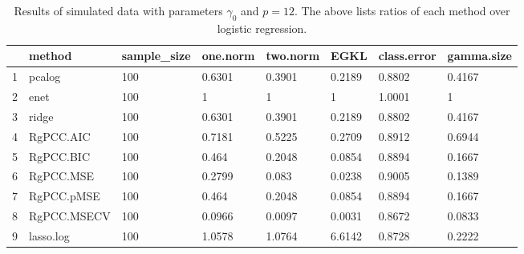 \begin{table}[ht]
\centering
\begin{tabular}{rlllllll}
  \hline
 & method & sample\_size & one.norm & two.norm & EGKL & class.error & gamma.size \\ 
  \hline
1 & pcalog & 100 & 0.6301 & 0.3901 & 0.2189 & 0.8802 & 0.4167 \\ 
  2 & enet & 100 & 1 & 1 & 1 & 1.0001 & 1 \\ 
  3 & ridge & 100 & 0.6301 & 0.3901 & 0.2189 & 0.8802 & 0.4167 \\ 
  4 & RgPCC.AIC & 100 & 0.7181 & 0.5225 & 0.2709 & 0.8912 & 0.6944 \\ 
  5 & RgPCC.BIC & 100 & 0.464 & 0.2048 & 0.0854 & 0.8894 & 0.1667 \\ 
  6 & RgPCC.MSE & 100 & 0.2799 & 0.083 & 0.0238 & 0.9005 & 0.1389 \\ 
  7 & RgPCC.pMSE & 100 & 0.464 & 0.2048 & 0.0854 & 0.8894 & 0.1667 \\ 
  8 & RgPCC.MSECV & 100 & 0.0966 & 0.0097 & 0.0031 & 0.8672 & 0.0833 \\ 
  9 & lasso.log & 100 & 1.0578 & 1.0764 & 6.6142 & 0.8728 & 0.2222 \\ 
   \hline
\end{tabular}
\caption{Results of simulated data with parameters $\gamma_0$ and $p =12$. The above lists ratios of each method over logistic regression.} 
\label{fig-0-debug-new-algo-12-metrics-pratio}
\end{table}
